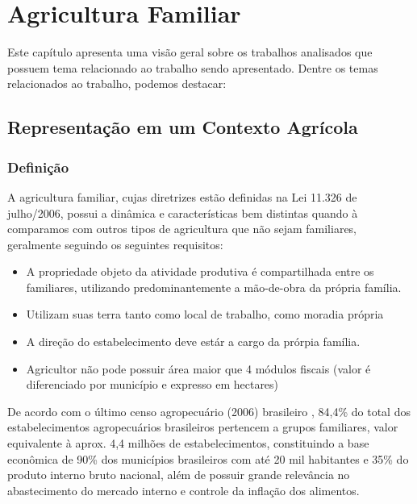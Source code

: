 \chapter{Agricultura Familiar}
Este cap\'{i}tulo apresenta uma vis\~{a}o geral sobre os trabalhos analisados que possuem tema relacionado ao trabalho sendo apresentado. Dentre os temas relacionados ao trabalho, podemos destacar:

\section{Representação em um Contexto Agrícola}

\subsection{Definição}
A agricultura familiar, cujas diretrizes estão definidas na Lei 11.326 de julho/2006, possui a dinâmica e características bem distintas quando à comparamos com outros tipos de agricultura que não sejam familiares, geralmente seguindo os seguintes requisitos: 

\begin{itemize}
	\item A propriedade objeto da atividade produtiva é compartilhada entre os familiares, utilizando predominantemente a mão-de-obra da própria família.
	\item Utilizam suas terra tanto como local de trabalho, como moradia própria
	\item A direção do estabelecimento deve estár a cargo da prórpia família.
	\item Agricultor não pode possuir área maior que 4 módulos fiscais (valor é diferenciado por município e expresso em hectares) 
\end{itemize}

De acordo com o último censo agropecuário (2006) brasileiro \cite{CENSOAGRO2006}, 84,4\% do total dos estabelecimentos agropecuários brasileiros pertencem a grupos familiares, valor equivalente à aprox. 4,4 milhões de estabelecimentos, constituindo a base econômica de 90\% dos municípios brasileiros com até 20 mil habitantes e 35\% do produto interno bruto nacional, além de possuir grande relevância no abastecimento do mercado interno e controle da inflação dos alimentos.


